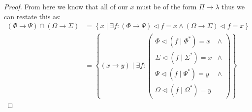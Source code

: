 \documentclass{article}
\begin{document}
\begin{proof}
From here we know that all of our $x$ must be of the form $\Pi \rightarrow \lambda$ thus we can restate this as:
\begin{align*}
(\Phi \rightarrow \Psi) \cap (\Omega \rightarrow \Sigma) &= \left\{x\mid\exists f:(\Phi \rightarrow \Psi)\lhd f = x \land (\Omega \rightarrow \Sigma) \lhd f = x\right\} \\
&= \left\{(x \rightarrow y)\mid\exists f:\left(
\begin{matrix}
\Phi \lhd (f \mid \Phi^\ast) = x & \land \\
\Sigma \lhd (f \mid \Sigma^\ast) = x & \land \\
\Psi \lhd (f \mid \Psi^\ast) = y & \land \\
\Omega \lhd (f \mid \Omega^\ast) = y &
\end{matrix}\right)\right\}
\end{align*}
\end{proof}
\end{document}
